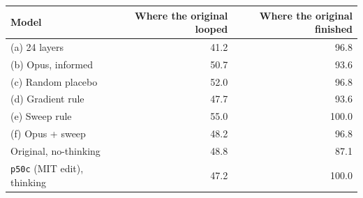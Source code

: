 \begin{tabular}{lrr}
\toprule
\textbf{Model} & \textbf{Where the original looped} & \textbf{Where the original finished} \\
\midrule
(a) 24 layers & 41.2 & 96.8 \\
(b) Opus, informed & 50.7 & 93.6 \\
(c) Random placebo & 52.0 & 96.8 \\
(d) Gradient rule & 47.7 & 93.6 \\
(e) Sweep rule & 55.0 & 100.0 \\
(f) Opus + sweep & 48.2 & 96.8 \\
Original, no-thinking & 48.8 & 87.1 \\
\texttt{p50c} (MIT edit), thinking & 47.2 & 100.0 \\
\bottomrule
\end{tabular}
